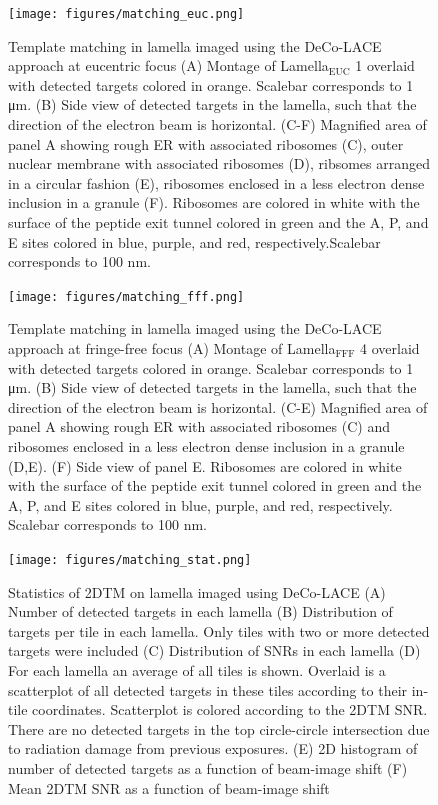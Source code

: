 \documentclass[
]{article}
\begin{document}
\begin{figure}
\hypertarget{fig:matching_euc}{%
\centering
\texttt{[image: figures/matching\_euc.png]}
\caption{Template matching in lamella imaged using the DeCo-LACE approach at
eucentric focus (A) Montage of Lamella\(_\textrm{EUC}\) 1 overlaid with
detected targets colored in orange. Scalebar corresponds to 1 μm. (B)
Side view of detected targets in the lamella, such that the direction of
the electron beam is horizontal. (C-F) Magnified area of panel A showing
rough ER with associated ribosomes (C), outer nuclear membrane with
associated ribosomes (D), ribsomes arranged in a circular fashion (E),
ribosomes enclosed in a less electron dense inclusion in a granule (F).
Ribosomes are colored in white with the surface of the peptide exit
tunnel colored in green and the A, P, and E sites colored in blue,
purple, and red, respectively.Scalebar corresponds to 100
nm.}\label{fig:matching_euc}
}
\end{figure}

\begin{figure}
\hypertarget{fig:matching_fff}{%
\centering
\texttt{[image: figures/matching\_fff.png]}
\caption{Template matching in lamella imaged using the DeCo-LACE approach at
fringe-free focus (A) Montage of Lamella\(_\textrm{FFF}\) 4 overlaid with
detected targets colored in orange. Scalebar corresponds to 1 μm. (B)
Side view of detected targets in the lamella, such that the direction of
the electron beam is horizontal. (C-E) Magnified area of panel A showing
rough ER with associated ribosomes (C) and ribosomes enclosed in a less
electron dense inclusion in a granule (D,E). (F) Side view of panel E.
Ribosomes are colored in white with the surface of the peptide exit
tunnel colored in green and the A, P, and E sites colored in blue,
purple, and red, respectively. Scalebar corresponds to 100
nm.}\label{fig:matching_fff}
}
\end{figure}

\begin{figure}
\hypertarget{fig:matching_stat}{%
\centering
\texttt{[image: figures/matching\_stat.png]}
\caption{Statistics of 2DTM on lamella imaged using DeCo-LACE (A) Number of
detected targets in each lamella (B) Distribution of targets per tile in
each lamella. Only tiles with two or more detected targets were included
(C) Distribution of SNRs in each lamella (D) For each lamella an average
of all tiles is shown. Overlaid is a scatterplot of all detected targets
in these tiles according to their in-tile coordinates. Scatterplot is
colored according to the 2DTM SNR. There are no detected targets in the
top circle-circle intersection due to radiation damage from previous
exposures. (E) 2D histogram of number of detected targets as a function
of beam-image shift (F) Mean 2DTM SNR as a function of beam-image
shift}\label{fig:matching_stat}
}
\end{figure}
\end{document}
